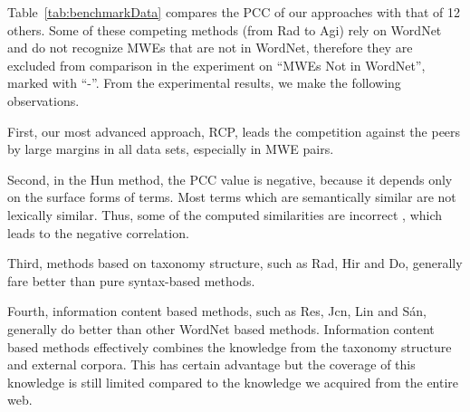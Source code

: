 Table~\ref{tab:benchmarkData} compares the PCC of our approaches with that of 12 others. Some of these competing methods (from Rad to Agi) rely
on WordNet and do not recognize MWEs that are not in WordNet, therefore they are excluded from comparison in the experiment on ``MWEs Not in
WordNet'', marked with ``-''.
From the experimental results, we make the following observations.

First, our most advanced approach, RCP, leads the competition
against the peers by large margins in all data sets,
especially in MWE pairs.

Second, in the Hun method, the PCC value is negative,
because it depends only on the
surface forms of terms. Most terms which are
semantically similar are not lexically similar.
Thus, some of the computed similarities are incorrect , which leads
to the negative correlation.

Third, methods based on taxonomy structure, such as Rad, Hir and Do,
generally fare better than pure syntax-based methods.

Fourth, information content based methods, such as
Res, Jcn, Lin and S\'{a}n, generally do better than other WordNet based
methods.
Information content based methods
effectively combines the knowledge from the taxonomy structure
and external corpora. This has certain advantage but the coverage of
this knowledge is still limited compared to the knowledge we acquired
from the entire web.

